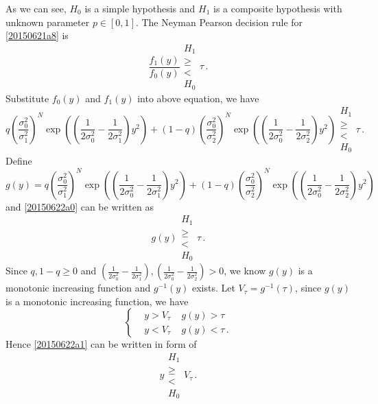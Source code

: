 As we can see, $H_0$ is a simple hypothesis and $H_1$ is a composite hypothesis with unknown parameter $p \in [0, 1]$. 
The Neyman Pearson decision rule for \eqref{20150621a8} is
\begin{equation}
  \frac{f_1(y)}{f_0(y)} \substack{H_1 \\ \geq \\ < \\ H_0} \tau\,.
\end{equation}
Substitute $f_0(y)$ and $f_1(y)$ into above equation, we have 
\begin{equation}
  q\left(\frac{\sigma_0^2}{\sigma_1^2}\right)^N\exp\left( (\frac{1}{2\sigma_0^2} -  \frac{1}{2\sigma_1^2}  )y^2 \right)
+ (1-q) \left(\frac{\sigma_0^2}{\sigma_2^2}\right)^N\exp\left( (\frac{1}{2\sigma_0^2} -  \frac{1}{2\sigma_2^2}  )y^2 \right)
\substack{H_1 \\ \geq \\ < \\ H_0} \tau\,.
\label{20150622a0}
\end{equation}
Define 
\begin{equation}
  g(y) = q\left(\frac{\sigma_0^2}{\sigma_1^2}\right)^N\exp\left( (\frac{1}{2\sigma_0^2} -  \frac{1}{2\sigma_1^2}  )y^2 \right)
+ (1-q) \left(\frac{\sigma_0^2}{\sigma_2^2}\right)^N\exp\left( (\frac{1}{2\sigma_0^2} -  \frac{1}{2\sigma_2^2}  )y^2 \right)\,
\end{equation}
and \eqref{20150622a0} can be written as
\begin{equation}
  g(y) \substack{H_1 \\ \geq \\ < \\ H_0} \tau\,.
  \label{20150622a1}
\end{equation}
Since $q, 1-q \geq 0$ and $(\frac{1}{2\sigma_0^2} -  \frac{1}{2\sigma_1^2}  ), (\frac{1}{2\sigma_0^2} -  \frac{1}{2\sigma_2^2}  ) >  0$, we know $g(y)$ is a monotonic increasing function and $g^{-1}(y) $ exists.  
Let $V_\tau = g^{-1}(\tau)$, since $g(y)$ is a monotonic increasing function, we have 
\begin{equation}
  \begin{cases}
    &y > V_\tau\;\;\;\;g(y) > \tau\\
    &y < V_\tau\;\;\;\;g(y) < \tau\,.
  \end{cases}
\end{equation}
Hence \eqref{20150622a1} can be written in form of 
\begin{equation}
  y  \substack{H_1 \\ \geq \\ < \\ H_0} V_\tau\,.
  \label{20150622a2}
\end{equation}

